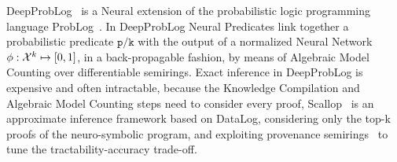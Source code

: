 DeepProbLog~\cite{manhaeve2018deepproblog} is a Neural extension of the probabilistic logic programming language ProbLog~\cite{de2007problog}. In DeepProbLog Neural Predicates link together a probabilistic predicate $\texttt{p/k}$ with the output of a normalized Neural Network $\phi: {\mathcal{X}}^k \mapsto [0, 1]$, in a back-propagable fashion, by means of Algebraic Model Counting over differentiable semirings.
Exact inference in DeepProbLog is expensive and often intractable, because the Knowledge Compilation and Algebraic Model Counting steps need to consider every proof, Scallop~\cite{li2023scallop} is an approximate inference framework based on DataLog, considering only the top-k proofs of the neuro-symbolic program, and exploiting provenance semirings~\cite{green2007provenance} to tune the tractability-accuracy trade-off.



